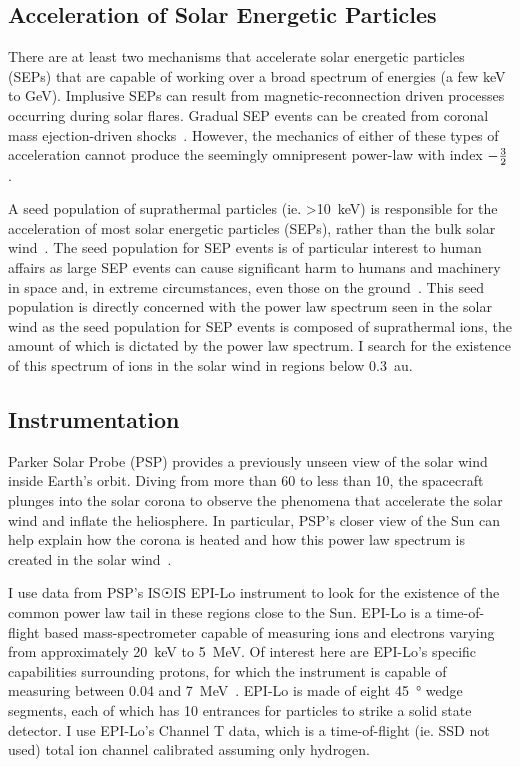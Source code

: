 \documentclass[letterpaper,11pt]{article}
\begin{document}
\subsection{Acceleration of Solar Energetic Particles}
There are at least two mechanisms that accelerate solar energetic particles (SEPs) that are capable of working over a broad spectrum of energies (a few \si{\kilo\electronvolt} to \si{\giga\electronvolt}).  Implusive SEPs can result from magnetic-reconnection driven processes occurring during solar flares.  Gradual SEP events can be created from coronal mass ejection-driven shocks~\citep{Desai2016}.  However, the mechanics of either of these types of acceleration cannot produce the seemingly omnipresent power-law with index $-{3 \over 2}$.

A seed population of suprathermal particles (ie. \SI{>10}{\kilo\electronvolt}) is responsible for the acceleration of most solar energetic particles (SEPs), rather than the bulk solar wind~\citep{Mewaldt2012}.  The seed population for SEP events is of particular interest to human affairs as large SEP events can cause significant harm to humans and machinery in space and, in extreme circumstances, even those on the ground~\citep{Desai2016}.  This seed population is directly concerned with the power law spectrum seen in the solar wind as the seed population for SEP events is composed of suprathermal ions, the amount of which is dictated by the power law spectrum.  I search for the existence of this spectrum of ions in the solar wind in regions below \SI{0.3}{\astronomicalunit}.

\subsection{Instrumentation}
\label{sec:intro:instrumentation}
Parker Solar Probe (PSP) provides a previously unseen view of the solar wind inside Earth's orbit.  Diving from more than 60 to less than \SI{10}{\solarradius}, the spacecraft plunges into the solar corona to observe the phenomena that accelerate the solar wind and inflate the heliosphere.  In particular, PSP's closer view of the Sun can help explain how the corona is heated and how this power law spectrum is created in the solar wind~\citep{McComas2014,McComas2007}.

I use data from PSP's IS$\Sun$IS EPI-Lo instrument to look for the existence of the common power law tail in these regions close to the Sun.  EPI-Lo is a time-of-flight based mass-spectrometer capable of measuring ions and electrons varying from approximately \SI{20}{\kilo\electronvolt} to \SI{5}{\mega\electronvolt}.  Of interest here are EPI-Lo's specific capabilities surrounding protons, for which the instrument is capable of measuring between 0.04 and \SI{7}{\mega\electronvolt}~\citep{McComas2014}.  EPI-Lo is made of eight \SI{45}{\degree} wedge segments, each of which has 10 entrances for particles to strike a solid state detector.  I use EPI-Lo's Channel T data, which is a time-of-flight (ie. SSD not used) total ion channel calibrated assuming only hydrogen.
\end{document}
